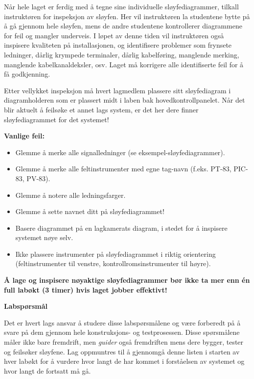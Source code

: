 Når hele laget er ferdig med å tegne sine individuelle sløyfediagrammer, tilkall instruktøren for inspeksjon av sløyfen.  Her vil instruktøren la studentene bytte på å gå gjennom hele sløyfen, mens de andre studentene kontrollerer diagrammene for feil og mangler underveis.  I løpet av denne tiden vil instruktøren også inspisere kvaliteten på installasjonen, og identifisere problemer som frynsete ledninger, dårlig krympede terminaler, dårlig kabelføring, manglende merking, manglende kabelkanaldeksler, osv.  Laget må korrigere alle identifiserte feil for å få godkjenning.

Etter vellykket inspeksjon må hvert lagmedlem plassere sitt sløyfediagram i diagramholderen som er plassert midt i laben bak hovedkontrollpanelet.  Når det blir aktuelt å feilsøke et annet lags system, er det her dere finner sløyfediagrammet for det systemet!

\vskip 10pt

{\bf Vanlige feil:}

\begin{itemize}
\item{} Glemme å merke alle signalledninger (se eksempel-sløyfediagrammer).
\item{} Glemme å merke alle feltinstrumenter med egne tag-navn (f.eks. PT-83, PIC-83, PV-83).
\item{} Glemme å notere alle ledningsfarger.
\item{} Glemme å sette navnet ditt på sløyfediagrammet!
\item{} Basere diagrammet på en lagkamerats diagram, i stedet for å inspisere systemet nøye selv.
\item{} Ikke plassere instrumenter på sløyfediagrammet i riktig orientering (feltinstrumenter til venstre, kontrollromsinstrumenter til høyre).
\end{itemize}

\vskip 10pt

{\bf Å lage og inspisere nøyaktige sløyfediagrammer bør ikke ta mer enn én full labøkt (3 timer) hvis laget jobber effektivt!}








\vfil \eject

\noindent
{\bf Labspørsmål}

\vskip 5pt

Det er hvert lags ansvar å studere disse labspørsmålene og være forberedt på å svare på dem gjennom hele konstruksjons- og testprosessen.  Disse spørsmålene måler ikke bare fremdrift, men {\it guider} også fremdriften mens dere bygger, tester og feilsøker sløyfene.  Lag oppmuntres til å gjennomgå denne listen i starten av hver labøkt for å vurdere hvor langt de har kommet i forståelsen av systemet og hvor langt de fortsatt må gå.


